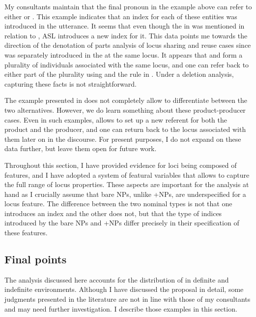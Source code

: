\documentclass[output=paper,
modfonts
]{langscibook}
\begin{document}
My consultants maintain that the final pronoun  in the example above can refer to either  or . This example indicates that an index for each of these entities was introduced in the utterance. It seems that even though the  in  was mentioned in relation to , ASL introduces a new index for it. This data points me towards the direction of the denotation of parts analysis of locus sharing and reuse cases since  was separately introduced in the  at the same locus. It appears that  and  form a plurality of individuals associated with the same locus, and one can refer back to either part of the plurality using  and the rule in . Under a deletion analysis, capturing these facts is not straightforward. 

The example presented in  does not completely allow to differentiate between the two alternatives. However, we do learn something about these product-producer  cases. Even in such examples,  allows to set up a new referent for both the product and the producer, and one can return back to the locus associated with them later on in the discourse. For present purposes, I do not expand on these data further, but leave them open for future work. 

Throughout this section, I have provided evidence for loci being composed of features, and I have adopted a system of featural variables that allows to capture the full range of locus properties. These aspects are important for the analysis at hand as I crucially assume that bare NPs, unlike +NPs, are underspecified for a locus feature. The difference between the two nominal types is not that one introduces an index and the other does not, but that the type of indices introduced by the bare NPs and +NPs differ precisely in their specification of these features. 

\subsection{Final points}

The analysis discussed here accounts for the distribution of  in definite and indefinite environments. Although I have discussed the proposal in detail, some judgments presented in the literature are not in line with those of my consultants and may need further investigation. I describe those examples in this section. \newpage
\end{document}
